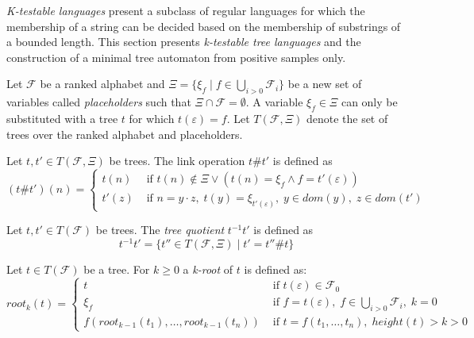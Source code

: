 \emph{K-testable languages} present a subclass of regular languages for which the membership of a string can be decided based on the membership of substrings of a bounded length. This section presents \emph{k-testable tree languages} and the construction of a minimal tree automaton from positive samples only.

\begin{defn}
Let $\mathcal{F}$ be a ranked alphabet and $\Xi = \{\xi_f \; | \; f \in \bigcup_{i>0} \mathcal{F}_i\}$ be a new set of variables called \emph{placeholders} such that $\Xi \cap \mathcal{F} = \emptyset$. A variable $\xi_f \in \Xi$ can only be substituted with a tree $t$ for which $t(\varepsilon) = f$. Let $T(\mathcal{F}, \Xi)$ denote the set of trees over the ranked alphabet and placeholders.
\end{defn}

\begin{defn}
Let $t, t' \in T(\mathcal{F}, \Xi)$ be trees. The link operation $t\#t'$ is defined as
\begin{equation*}
    (t\#t')(n) = 
    \begin{cases}
        t(n) & \text{ if } t(n) \notin \Xi \vee (t(n) = \xi_f \wedge f = t'(\varepsilon))\\
        t'(z) & \text{ if } n = y \cdot z, \; t(y) = \xi_{t'(\varepsilon)}, \; y \in dom(y), \; z \in dom(t')
    \end{cases}
\end{equation*}
\end{defn}

\begin{defn}
Let $t, t' \in T(\mathcal{F})$ be trees. The \emph{tree quotient} $t^{-1}t'$ is defined as $$t^{-1}t' = \{t'' \in T(\mathcal{F}, \Xi) \; | \; t' = t'' \# t\}$$
\end{defn}

\begin{defn}
Let $t \in T(\mathcal{F})$ be a tree. For $k \geq 0$ a \emph{k-root} of $t$ is defined as:
\begin{equation*}
    root_k(t) = 
    \begin{cases}
        t & \text{ if } t(\varepsilon) \in \mathcal{F}_0\\
        \xi_f & \text{ if } f = t(\varepsilon), \; f \in \bigcup_{i > 0}\mathcal{F}_i, \; k = 0\\
        f(root_{k-1}(t_1), \dots, root_{k-1}(t_n)) & \text{ if } t = f(t_1, \dots, t_n), \; height(t) > k > 0
    \end{cases}
\end{equation*}
\end{defn}

